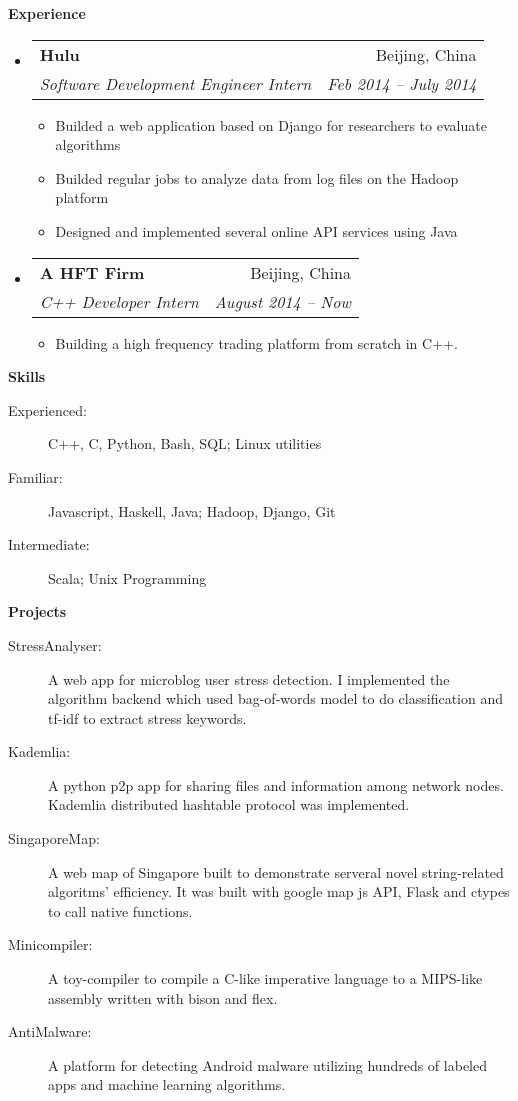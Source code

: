 \documentclass[letterpaper,11pt]{article}
\makeatletter
\newcommand{\resitem}[1]{\item #1 \vspace{-2pt}}
\newcommand{\resheading}[1]{{\large \colorbox{mygrey}{\begin{minipage}{\textwidth}{\textbf{#1 \vphantom{p\^{E}}}}\end{minipage}}}}
\newcommand{\ressubheading}[4]{
\begin{tabular*}{6.5in}{l@{\extracolsep{\fill}}r}
        \textbf{#1} & #2 \\
        \textit{#3} & \textit{#4} \\
\end{tabular*}\vspace{-6pt}}
\makeatother
\begin{document}
\resheading{Experience}
    \begin{itemize}
        \item 
            \ressubheading{Hulu}{Beijing, China}
                {Software Development Engineer Intern}{Feb 2014 -- July 2014}
                { \footnotesize
                \begin{itemize}
						\resitem{Builded a web application based on Django for researchers to evaluate algorithms}
                        \resitem{Builded regular jobs to analyze data from log files on the Hadoop platform}
                        \resitem{Designed and implemented several online API services using Java}
                \end{itemize}
                }
        \item 
			\ressubheading{A HFT Firm}{Beijing, China}{C++ Developer Intern}{August 2014 -- Now}
                { \footnotesize
                \begin{itemize}
                        \resitem{Building a high frequency trading platform from scratch in C++. }
                \end{itemize}
                }
    \end{itemize}  %

\resheading{Skills}
    \begin{description}
    \item[Experienced:] { \footnotesize C++, C, Python, Bash, SQL; Linux utilities}
    \item[Familiar:] { \footnotesize Javascript, Haskell, Java; Hadoop, Django, Git}
    \item[Intermediate:] { \footnotesize Scala; Unix Programming}
    \end{description} %
\resheading{Projects}
    \begin{description}
	\item[StressAnalyser:]{\footnotesize A web app for microblog user stress detection. I implemented the algorithm backend which used bag-of-words model to do classification and tf-idf to extract stress keywords.}  
	\item[Kademlia:]{\footnotesize A python p2p app for sharing files and information among network nodes. Kademlia distributed hashtable protocol was implemented.}
    \item[SingaporeMap:]{\footnotesize A web map of Singapore built to demonstrate serveral novel string-related algoritms' efficiency. It was built with google map js API, Flask and ctypes to call native functions.}
    \item[Minicompiler:]{\footnotesize A toy-compiler to compile a C-like imperative language to a MIPS-like assembly written with bison and flex. }
	\item[AntiMalware:] {\footnotesize A platform for detecting Android malware utilizing hundreds of labeled apps and machine learning algorithms. }
    \end{description}
\end{document}
